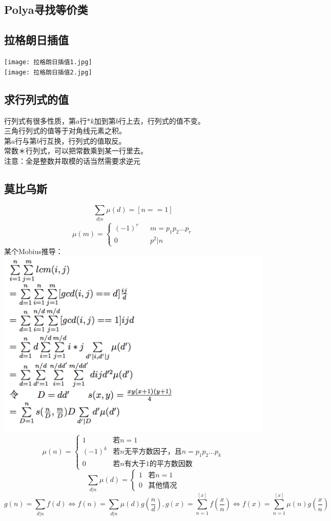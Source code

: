 \documentclass[landscape,a4paper]{article}
\begin{document}
\begin{spacing}{0.3}
\begin{multicols}{2}
		\subsection{Polya寻找等价类}
		
		\subsection{拉格朗日插值}
		\texttt{[image: 拉格朗日插值1.jpg]}\\
		\texttt{[image: 拉格朗日插值2.jpg]} 
		\subsection{求行列式的值}
			行列式有很多性质，第$a$行$*k$加到第$b$行上去，行列式的值不变。\\
			三角行列式的值等于对角线元素之积。\\
			第$a$行与第$b$行互换，行列式的值取反。\\
			常数＊行列式，可以把常数乘到某一行里去。\\
			注意：全是整数并取模的话当然需要求逆元
		\subsection{莫比乌斯}
		$$\sum_{d|n}\mu(d)=[n==1]$$ 
		$$ \mu(m)=\left\{
		\begin{array}{rcl}
		(-1)^r      &      & {m=p_1p_2...p_r}\\
		0  &      & {p^2|n}
		\end{array} \right.
		$$
		某个Mobius推导：\\
		\includegraphics{Mobius.png}
		$$\mu(n) = \begin{cases}
	1 & \text{若}n=1\\
	(-1)^k & \text{若}n\text{无平方数因子，且}n = p_1p_2\dots p_k\\
	0 & \text{若}n\text{有大于}1\text{的平方数因数}
\end{cases}$$
$$\sum_{d|n}{\mu(d)} = \begin{cases}
	1 & \text{若}n=1\\
	0 & \text{其他情况}
\end{cases}$$
$$g(n) = \sum_{d|n}{f(d)} \Leftrightarrow f(n) = \sum_{d|n}{\mu(d)g(\frac{n}{d})}
,       g(x) = \sum_{n=1}^{[x]}f(\frac{x}{n}) \Leftrightarrow f(x) = \sum_{n=1}^{[x]}{\mu(n)g(\frac{x}{n})}$$


\end{multicols}
\end{spacing}
\end{document}
